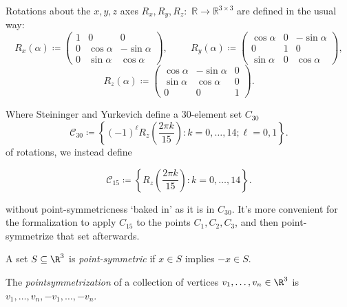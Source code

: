 Rotations about the $x, y, z$ axes $R_x,R_y,R_z:$  $\mathbb{R}\to \mathbb{R}^{3\times 3}$
are defined in the usual way:
    \[
            R_x(\alpha)\coloneqq
        \begin{pmatrix}
            1 & 0 & 0\\
            0 & \cos\alpha & -\sin\alpha\\
            0 & \sin\alpha & \cos\alpha
        \end{pmatrix},
        \hspace{1cm}
        R_y(\alpha)\coloneqq
        \begin{pmatrix}
            \cos\alpha & 0 & -\sin\alpha\\
            0 & 1 & 0\\
            \sin\alpha & 0 & \cos\alpha
        \end{pmatrix},
    \]
    \[
        R_z(\alpha)\coloneqq
        \begin{pmatrix}
            \cos\alpha & -\sin\alpha &0\\
            \sin\alpha & \cos\alpha &0\\
            0 & 0 & 1
        \end{pmatrix}.
    \]

Where Steininger and Yurkevich define a 30-element set $C_{30}$
\[
    \mathcal{C}_{30} \coloneqq \left\{(-1)^\ell R_z\left(\frac{2\pi k}{15}\right) \colon k=0,\dots,14; \ell=0,1\right\}.
\]
of rotations, we instead define
\begin{definition}
  \label{def:C15}
  \leanok
\[
    \mathcal{C}_{15} \coloneqq \left\{ R_z\left(\frac{2\pi k}{15}\right) \colon k=0,\dots,14 \right\}.
\]
\end{definition}
without point-symmetricness `baked in' as it is in $C_{30}$. It's more convenient for the formalization to apply $C_{15}$ to the points $C_1, C_2, C_3$, and then point-symmetrize that set afterwards.

\begin{definition}
\label{def:pointsymmetric}
\leanok
A set $S \subseteq \R^3$ is {\em point-symmetric} if $x \in S$ implies $-x \in S$.
\end{definition}

\begin{definition}
\label{def:pointsymmetrize}
\leanok
The {\em pointsymmetrization} of a collection of vertices $v_1, \ldots, v_n \in \R^3$
is $v_1, \ldots, v_n, -v_1, \ldots, -v_n$.
\end{definition}

